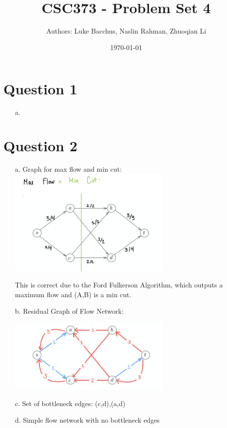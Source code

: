 \documentclass[12pt]{article}
\title{\textbf{CSC373 - Problem Set 4}}
\author{Authors: Luke Bacchus, Naslin Rahman, Zhuoqian Li}
\date{\today}
\begin{document}
\maketitle
\section*{Question 1}
\begin{enumerate}
    \item[a.] 
\end{enumerate}

\newpage

\section*{Question 2}
\begin{enumerate}
    \item[a.] Graph for max flow and min cut:\\
        
        \includegraphics[width=8cm]{Graphs/2A.png}

        This is correct due to the Ford Fulkerson Algorithm, which outputs a maximum flow and (A,B) is a min cut.

    \item[b.]  Residual Graph of Flow Network:

        \includegraphics[width=8cm]{Graphs/2B.png}

    \item[c. ]Set of bottleneck edges: {(c,d),(a,d)}
    \item[d. ] Simple flow network with no bottleneck edges
    

\end{enumerate}
\end{document}
